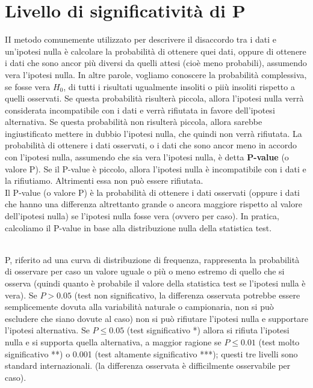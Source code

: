 \documentclass[10pt, draft]{book}
\begin{document}
\section{Livello di significatività di P}
II metodo comunemente utilizzato per descrivere il disaccordo tra i dati e un'ipotesi nulla è calcolare la probabilità di ottenere quei dati, oppure di ottenere i dati che sono ancor più diversi da quelli attesi (cioè meno probabili), assumendo vera l'ipotesi nulla. In altre parole, vogliamo conoscere la probabilità complessiva, se fosse vera $H_0$, di tutti i risultati ugualmente insoliti o piiù insoliti rispetto a quelli osservati. Se questa probabilità risulterà piccola, allora l'ipotesi nulla verrà considerata incompatibile con i dati e verrà rifiutata in favore dell'ipotesi alternativa. Se questa probabilità non risulterà piccola, allora sarebbe ingiustificato mettere in dubbio l'ipotesi nulla, che quindi non verrà rifiutata. La probabilità di ottenere i dati osservati, o i dati che sono ancor meno in accordo con l'ipotesi nulla, assumendo che sia vera l'ipotesi nulla, è detta \textbf{P-value} (o valore P). Se il P-value è piccolo, allora l'ipotesi nulla è incompatibile con i dati e la rifiutiamo. Altrimenti essa non può essere rifiutata.
\\
Il P-value (o valore P) è la probabilità di ottenere i dati osservati (oppure i dati che hanno una differenza altrettanto grande o ancora maggiore rispetto al valore dell'ipotesi nulla) se l'ipotesi nulla fosse vera (ovvero per caso). In pratica, calcoliamo il P-value in base alla distribuzione nulla della statistica test.
\\
\\
\colorbox{lyellow}{\parbox{0.98\textwidth}{
    P, riferito ad una curva di distribuzione di frequenza, rappresenta la probabilità di osservare per caso un valore uguale o più o meno estremo di quello che si osserva (quindi quanto è probabile il valore della statistica test se l'ipotesi nulla è vera). Se $P>0.05$ (test non significativo, la differenza osservata potrebbe essere semplicemente dovuta alla variabilità naturale o campionaria, non si può escludere che siano dovute al caso) non si può rifiutare l'ipotesi nulla e supportare l'ipotesi alternativa. Se $P \le 0.05$ (test significativo *) allora si rifiuta l'ipotesi nulla e si supporta quella alternativa, a maggior ragione se $P \le 0.01$ (test molto significativo **) o 0.001 (test altamente significativo ***); questi tre livelli sono standard internazionali. (la differenza osservata è difficilmente osservabile per caso).}}
\end{document}
